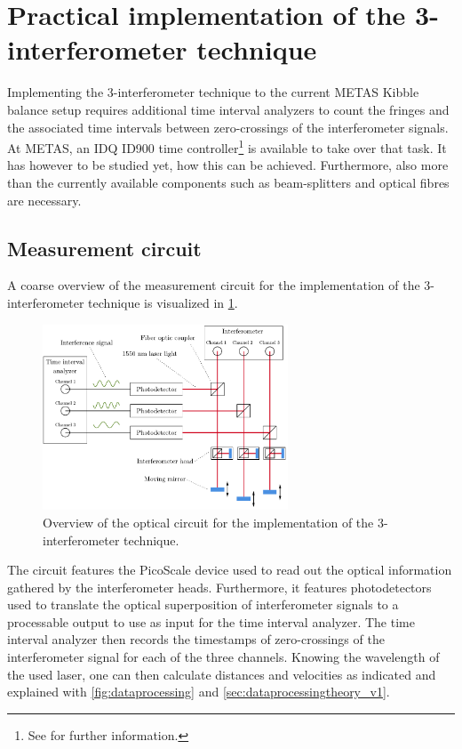 \documentclass{report}
\numberwithin{tm}{section}
\begin{document}
\section{Practical implementation of the 3-interferometer technique}
Implementing the 3-interferometer technique to the current METAS Kibble balance setup requires additional time interval analyzers to count the fringes and the associated time intervals between zero-crossings of the interferometer signals. At METAS, an IDQ ID900 time controller\footnote{See \cite{IDQ.2018} for further information.} is available to take over that task. It has however to be studied yet, how this can be achieved. Furthermore, also more than the currently available components such as beam-splitters and optical fibres are necessary.

\subsection{Measurement circuit}
A coarse overview of the measurement circuit for the implementation of the 3-interferometer technique is visualized in \cref{fig:measurement_circuit}.
\begin{figure}[h]
	\centering
	\includegraphics[width=0.65\textwidth]{figures/measurement_circuit.pdf}
	\caption{Overview of the optical circuit for the implementation of the 3-interferometer technique.}
	\label{fig:measurement_circuit}
\end{figure}
The circuit features the PicoScale device used to read out the optical information gathered by the interferometer heads. Furthermore, it features photodetectors used to translate the optical superposition of interferometer signals to a processable output to use as input for the time interval analyzer. The time interval analyzer then records the timestamps of zero-crossings of the interferometer signal for each of the three channels. Knowing the wavelength of the used laser, one can then calculate distances and velocities as indicated and explained with \cref{fig:dataprocessing} and \cref{sec:dataprocessingtheory_v1}.
\end{document}
